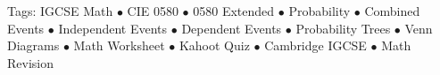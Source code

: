 \documentclass[11pt,a4paper]{article}
\begin{document}
\vspace{14pt}
\begin{center}
  \sffamily\scriptsize\textcolor{textmuted}{
    Tags: IGCSE Math $\bullet$ CIE 0580 $\bullet$ 0580 Extended $\bullet$ Probability $\bullet$ Combined Events $\bullet$ Independent Events $\bullet$ Dependent Events $\bullet$ Probability Trees $\bullet$ Venn Diagrams $\bullet$ Math Worksheet $\bullet$ Kahoot Quiz $\bullet$ Cambridge IGCSE $\bullet$ Math Revision
  }
\end{center}
\end{document}
